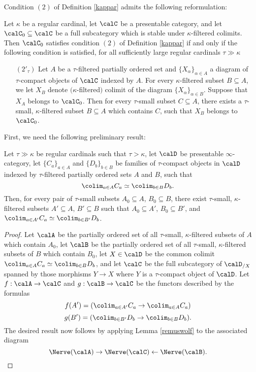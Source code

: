 \begin{Model Categories}
Condition $(2)$ of Definition \ref{kappar} admits the following reformulation:

\begin{proposition}\label{reefa} Let $\kappa$ be a regular cardinal, let $\calC$ be a presentable category, and let $\calC_0 \subseteq \calC$ be a full subcategory which is stable under $\kappa$-filtered colimits. Then $\calC_0$ satisfies condition $(2)$ of Definition \ref{kappar} if and only if the following condition is satisfied, for all sufficiently large regular cardinals $\tau \gg \kappa$
\begin{itemize}
\item[$(2'_{\tau})$] Let $A$ be a $\tau$-filtered partially ordered set and
$\{ X_{\alpha} \}_{\alpha \in A}$ a diagram of $\tau$-compact objects of $\calC$ indexed by $A$.
For every $\kappa$-filtered subset $B \subseteq A$, we let
$X_B$ denote $(${}$\kappa$-filtered$)$ colimit of the diagram $\{ X_{\alpha} \}_{\alpha \in B}$.
Suppose that $X_{A}$ belongs to $\calC_0$. Then for every $\tau$-small subset $C \subseteq A$,
there exists a $\tau$-small, $\kappa$-filtered subset $B \subseteq A$ which contains $C$, such that
$X_B$ belongs to $\calC_0$. 
\end{itemize}
\end{proposition}

First, we need the following preliminary result:

\begin{lemma}\label{constunt}
Let $\tau \gg \kappa$ be regular cardinals such that $\tau > \kappa$, let $\calD$ be presentable $\infty$-category, let $\{ C_{a} \}_{a \in A}$ and $\{ D_{b} \}_{b \in B}$ be families of $\tau$-compact objects in $\calD$ indexed by $\tau$-filtered partially ordered sets $A$ and $B$, such that
$$ \colim_{a \in A} C_{a} \simeq \colim_{b \in B} D_{b}.$$
Then, for every pair of $\tau$-small subsets $A_0 \subseteq A$, $B_0 \subseteq B$, there
exist $\tau$-small, $\kappa$-filtered subsets $A' \subseteq A$, $B' \subseteq B$ such that
$A_0 \subseteq A'$, $B_0 \subseteq B'$, and $\colim_{a \in A'} C_a \simeq \colim_{b \in B'} D_b$.
\end{lemma}

\begin{proof}
Let $\calA$ be the partially ordered set of all $\tau$-small, $\kappa$-filtered subsets of
$A$ which contain $A_0$, let $\calB$ be the partially ordered set of all $\tau$-small, $\kappa$-filtered subsets of $B$ which contain $B_0$, let $X \in \calD$ be the common colimit
$ \colim_{a \in A} C_{a} \simeq \colim_{b \in B} D_{b}$, and let $\calC$ be the full subcategory
of $\calD_{/X}$ spanned by those morphisms $Y \rightarrow X$ where $Y$ is a $\tau$-compact object of $\calD$. Let $f: \calA \rightarrow \calC$ and $g: \calB \rightarrow \calC$ be the functors described by the formulas
$$f( A' ) = ( \colim_{a \in A'} C_{a} \rightarrow \colim_{a \in A} C_a )$$
$$g( B' ) = ( \colim_{b \in B'} D_{b} \rightarrow \colim_{b \in B} D_b ).$$
The desired result now follows by applying Lemma \ref{remuswolf} to the associated diagram
$$ \Nerve(\calA) \rightarrow \Nerve(\calC) \leftarrow \Nerve(\calB).$$
\end{proof}


\end{Model Categories}
